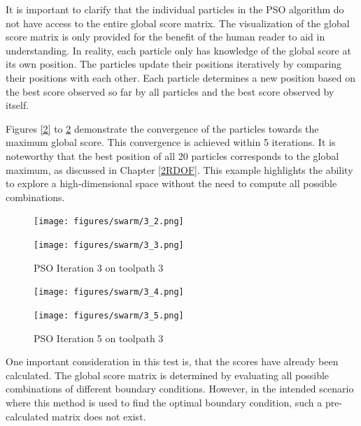 It is important to clarify that the individual particles in the \acrshort{PSO} algorithm do not have access to the entire global score matrix. The visualization of the global score matrix is only provided for the benefit of the human reader to aid in understanding. In reality, each particle only has knowledge of the global score at its own position. The particles update their positions iteratively by comparing their positions with each other. Each particle determines a new position based on the best score observed so far by all particles and the best score observed by itself. 

Figures \ref{2} to \ref{5} demonstrate the convergence of the particles towards the maximum global score. This convergence is achieved within 5 iterations. It is noteworthy that the best position of all 20 particles corresponds to the global maximum, as discussed in Chapter \ref{2RDOF}. This example highlights the ability to explore a high-dimensional space without the need to compute all possible combinations.


\begin{figure}[H]
	\centering
	\begin{minipage}{0.5\textwidth}
		\texttt{[image: figures/swarm/3\_2.png]}
		\caption{PSO Iteration 2 on toolpath 3}
		\label{2}
	\end{minipage}\hfill
	\begin{minipage}{0.5\textwidth}
		\texttt{[image: figures/swarm/3\_3.png]}
		\caption{PSO Iteration 3 on toolpath 3}
		\label{3}
	\end{minipage}\par
\end{figure}	


\begin{figure}[H]	
		\centering
	\begin{minipage}{0.5\textwidth}
		\texttt{[image: figures/swarm/3\_4.png]}
		\caption{PSO Iteration 4 on toolpath 3}
		\label{4}
	\end{minipage}\hfill
	\begin{minipage}{0.5\textwidth}
		\texttt{[image: figures/swarm/3\_5.png]}
		\caption{PSO Iteration 5 on toolpath 3}
		\label{5}
	\end{minipage}\par
\end{figure}

One important consideration in this test is, that the scores have already been calculated. The global score matrix is determined by evaluating all possible combinations of different boundary conditions. However, in the intended scenario where this method is used to find the optimal boundary condition, such a pre-calculated matrix does not exist.

